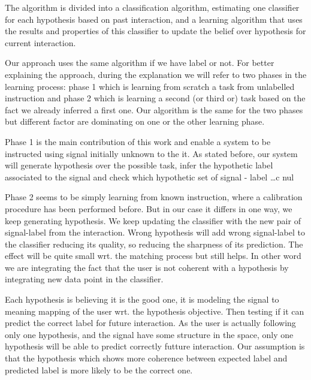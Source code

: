 The algorithm is  divided into a classification algorithm, estimating one classifier for each hypothesis based on past interaction, and a learning algorithm that uses the results and properties of this classifier to update the belief over hypothesis for current interaction.

Our approach uses the same algorithm if we have label or not. For better explaining the approach, during the explanation we will refer to two phases in the learning process: phase 1 which is learning from scratch a task from unlabelled instruction and phase 2 which is learning a second (or third or) task based on the fact we already inferred a first one. Our algorithm is the same for the two phases but different factor are dominating on one or the other learning phase.

Phase 1 is the main contribution of this work and enable a system to be instructed using signal initially unknown to the it. As stated before, our system will generate hypothesis over the possible task, infer the hypothetic label associated to the signal and check which hypothetic set of signal - label \ldots c nul

Phase 2 seems to be simply learning from known instruction, where a calibration procedure has been performed before. But in our case it differs in one way, we keep generating hypothesis. We keep updating the classifier with the new pair of signal-label from the interaction. Wrong hypothesis will add wrong signal-label to the classifier reducing its quality, so reducing the sharpness of its prediction. The effect will be quite small wrt. the matching process but still helps. In other word we are integrating the fact that the user is not coherent with a hypothesis by integrating new data point in the classifier.

Each hypothesis is believing it is the good one, it is modeling the signal to meaning mapping of the user wrt. the hypothesis objective. Then testing if it can predict the correct label for future interaction. As the user is actually following only one hypothesis, and the signal have some structure in the space, only one hypothesis will be able to predict correctly futture interaction. Our assumption is that the hypothesis which shows more coherence between expected label and predicted label is more likely to be the correct one. 

